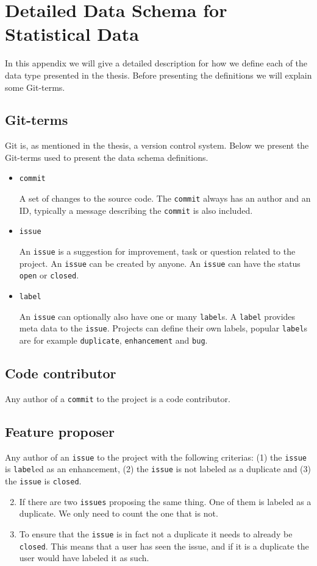 \section{Detailed Data Schema for Statistical Data}
\label{ap:detail_data}
In this appendix we will give a detailed description for how we define each of the data type presented in the thesis. Before presenting the definitions we will explain some Git-terms.

\subsection*{Git-terms}
Git is, as mentioned in the thesis, a version control system. Below we present the Git-terms used to present the data schema definitions.

\begin{itemize}
	\item\texttt{commit}

	A set of changes to the source code. The \texttt{commit} always has an author and an ID, typically a message describing the \texttt{commit} is also included.
	\item\texttt{issue}

	An \texttt{issue} is a suggestion for improvement, task or question related to the project. An \texttt{issue} can be created by anyone. An \texttt{issue} can have the status \texttt{open} or \texttt{closed}.

	\item\texttt{label}

	An \texttt{issue} can optionally also have one or many \texttt{label}s. A \texttt{label} provides meta data to the \texttt{issue}. Projects can define their own labels, popular \texttt{label}s are for example \texttt{duplicate}, \texttt{enhancement} and \texttt{bug}.
\end{itemize}

\subsection*{Code contributor}
Any author of a \texttt{commit} to the project is a code contributor.
\subsection*{Feature proposer}
Any author of an \texttt{issue} to the project with the following criterias: (1) the \texttt{issue} is \texttt{label}ed as an enhancement, (2) the \texttt{issue} is not labeled as a duplicate and (3) the \texttt{issue} is \texttt{closed}.
\begin{enumerate}
	\setcounter{enumi}{1}
	\item If there are two \texttt{issues} proposing the same thing. One of them is labeled as a duplicate. We only need to count the one that is not.
	\item To ensure that the \texttt{issue} is in fact not a duplicate it needs to already be \texttt{closed}. This means that a user has seen the issue, and if it is a duplicate the user would have labeled it as such.
\end{enumerate}
